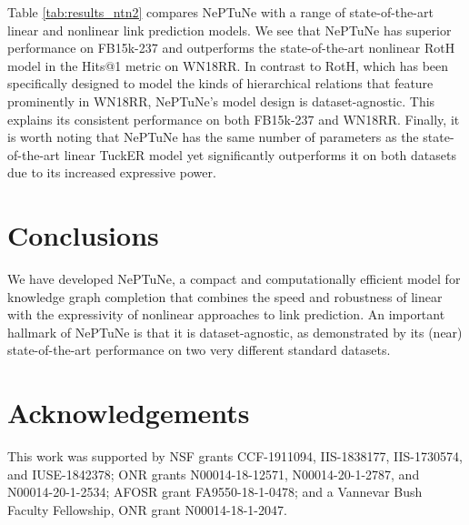 \documentclass[11pt]{article}
\begin{document}
Table \ref{tab:results_ntn2} compares NePTuNe with a range of state-of-the-art linear and nonlinear link prediction models.
We see that NePTuNe has superior performance on FB15k-237 and outperforms the state-of-the-art nonlinear RotH model \cite{chami2020low} in the Hits@1 metric on WN18RR.
In contrast to RotH, which has been specifically designed to model the kinds of hierarchical relations that feature prominently in WN18RR, NePTuNe's model design is dataset-agnostic. 
This explains its consistent performance on both FB15k-237 and WN18RR.
Finally, it is worth noting that NePTuNe has the same number of parameters as the state-of-the-art linear TuckER model yet significantly outperforms it on both datasets due to its increased expressive power.


\section{Conclusions} 

We have developed NePTuNe, a compact and computationally efficient model for knowledge graph completion that combines the speed and robustness of linear with the expressivity of nonlinear approaches to link prediction.
An important hallmark of NePTuNe is that it is dataset-agnostic, as demonstrated by its  (near) state-of-the-art performance on two very different standard datasets.





\section*{Acknowledgements}

This work was supported by NSF grants CCF-1911094, IIS-1838177, IIS-1730574, and IUSE-1842378; ONR grants N00014-18-12571, N00014-20-1-2787, and N00014-20-1-2534; AFOSR grant FA9550-18-1-0478; and a Vannevar Bush Faculty Fellowship, ONR grant N00014-18-1-2047.






\end{document}
